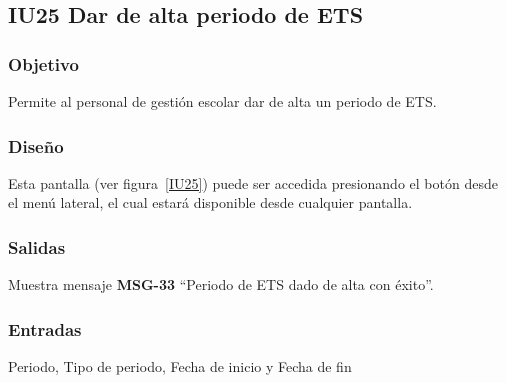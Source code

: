 
\subsection{IU25 Dar de alta periodo de ETS}
\subsubsection{Objetivo}
    Permite al personal de gestión escolar dar de alta un periodo de ETS.
\subsubsection{Diseño}
    Esta pantalla  (ver figura~\ref{IU25}) puede ser accedida presionando el botón  desde el menú lateral, el cual estará disponible desde cualquier pantalla. 
    

\subsubsection{Salidas}
Muestra mensaje {\bf MSG-33} ``Periodo de ETS  dado de alta con éxito''.
\subsubsection{Entradas}
Periodo, Tipo de periodo, Fecha de inicio y Fecha de fin
